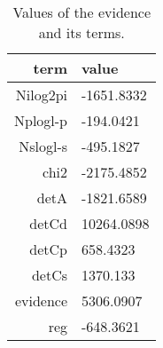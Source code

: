 \begin{table*}\caption{Values of the evidence and its terms.}\begin{center}\begin{tabular}{ r l } term & value \\
\hline Nilog2pi & -1651.8332 \\ 
Nplogl-p & -194.0421 \\ 
Nslogl-s & -495.1827 \\ 
chi2 & -2175.4852 \\ 
detA & -1821.6589 \\ 
detCd & 10264.0898 \\ 
detCp & 658.4323 \\ 
detCs & 1370.133 \\ 
evidence & 5306.0907 \\ 
reg & -648.3621 \\ 
\hline\end{tabular}\end{center}\label{tab:2}\end{table*}